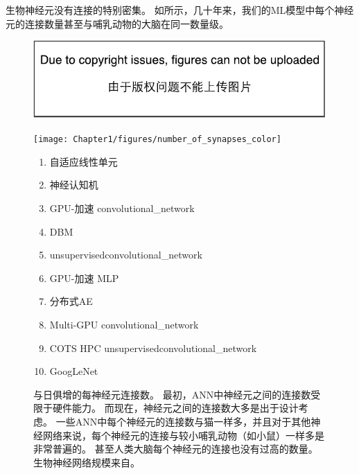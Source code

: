 生物神经元没有连接的特别密集。
如所示，几十年来，我们的\gls{ML}模型中每个神经元的连接数量甚至与哺乳动物的大脑在同一数量级。
\begin{figure}[!htb]
\ifOpenSource
\centerline{\includegraphics{figure.pdf}}
\else
\centerline{\texttt{[image: Chapter1/figures/number\_of\_synapses\_color]}}
\fi
\caption{与日俱增的每神经元连接数。 %
最初，\gls{ANN}中神经元之间的连接数受限于硬件能力。
而现在，神经元之间的连接数大多是出于设计考虑。
一些\gls{ANN}中每个神经元的连接数与猫一样多，并且对于其他神经网络来说，每个神经元的连接与较小哺乳动物（如小鼠）一样多是非常普遍的。
甚至人类大脑每个神经元的连接也没有过高的数量。
生物神经网络规模来自\citet{number_of_neurons}。
}
\label{fig:chap1_number_of_synapses_color}
{\tiny
\begin{enumerate}
  \itemsep0em
  \item %
    自适应线性单元~\citep{Widrow60}
  \item %
    神经认知机~\citep{Fukushima80}
  \item %
    GPU-加速 \gls{convolutional_network}~\citep{chellapilla:inria-00112631}
  \item %
    \gls{DBM}~\citep{SalHinton09}
  \item %
    \gls{unsupervised}\gls{convolutional_network}~\citep{Jarrett-ICCV2009-small}
  \item %
    GPU-加速 \gls{MLP}~\citep{Ciresan-2010}
  \item %
    分布式\gls{AE}~\citep{QuocLe-ICML2012}
  \item %
    Multi-GPU \gls{convolutional_network}~\citep{Krizhevsky-2012-small}
  \item %
    COTS HPC  \gls{unsupervised}\gls{convolutional_network}~\citep{icml2013_coates13}
  \item %
    GoogLeNet~\citep{Szegedy-et-al-arxiv2014}
\end{enumerate}
} %
\end{figure}


